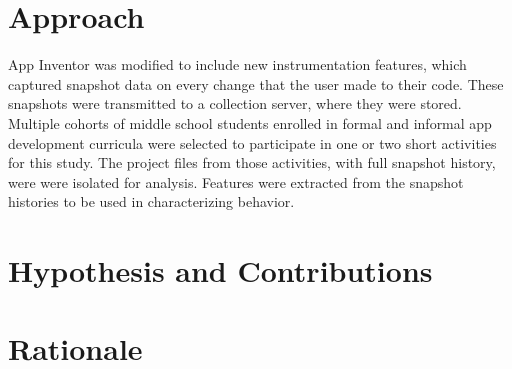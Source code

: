 

\section{Approach}
App Inventor was modified to include new instrumentation features, which captured snapshot data on every change that the user made to their code. These snapshots were transmitted to a collection server, where they were stored. Multiple cohorts of middle school students enrolled in formal and informal app development curricula were selected to participate in one or two short activities for this study. The project files from those activities, with full snapshot history, were were isolated for analysis. Features were extracted from the snapshot histories to be used in characterizing behavior. %


\section{Hypothesis and Contributions}


\section{Rationale}
